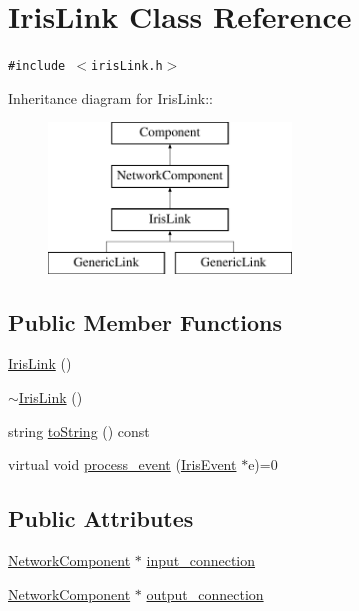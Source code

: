 \hypertarget{classIrisLink}{
\section{IrisLink Class Reference}
\label{classIrisLink}
}
{\tt \#include $<$irisLink.h$>$}

Inheritance diagram for IrisLink::\begin{figure}[H]
\begin{center}
\leavevmode
\includegraphics[height=4cm]{classIrisLink}
\end{center}
\end{figure}
\subsection*{Public Member Functions}
\begin{CompactItemize}
\item 
\hyperlink{classIrisLink_338c9fe1f9c8424e885d8e48d43ca2e3}{IrisLink} ()
\item 
\hyperlink{classIrisLink_2d3be414256bdfab31989b0f3c437da2}{$\sim$IrisLink} ()
\item 
string \hyperlink{classIrisLink_d25db1c98385d7abd82180e5746813a6}{toString} () const 
\item 
virtual void \hyperlink{classIrisLink_9c5494bc5716aedf3affe748f3a542c1}{process\_\-event} (\hyperlink{classIrisEvent}{IrisEvent} $\ast$e)=0
\end{CompactItemize}
\subsection*{Public Attributes}
\begin{CompactItemize}
\item 
\hyperlink{classNetworkComponent}{NetworkComponent} $\ast$ \hyperlink{classIrisLink_be439e50b48bbe45bb99c2546f83f9ee}{input\_\-connection}
\item 
\hyperlink{classNetworkComponent}{NetworkComponent} $\ast$ \hyperlink{classIrisLink_137f7502dc308ec2c812753a7ef0b72b}{output\_\-connection}
\end{CompactItemize}


